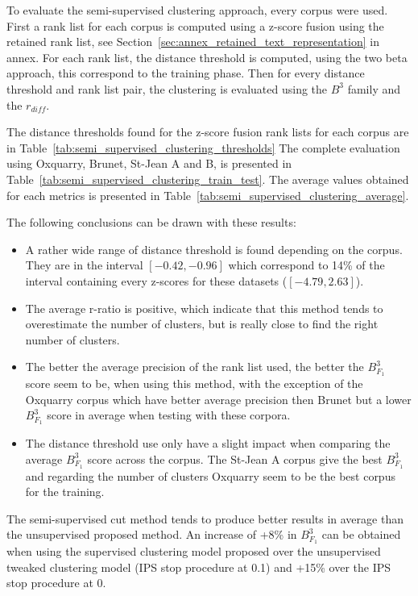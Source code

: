 To evaluate the semi-supervised clustering approach, every corpus were used.
First a rank list for each corpus is computed using a z-score fusion using the retained rank list, see Section~\ref{sec:annex_retained_text_representation} in annex.
For each rank list, the distance threshold is computed, using the two beta approach, this correspond to the training phase.
Then for every distance threshold and rank list pair, the clustering is evaluated using the $B^3$ family and the $r_{diff}$.

The distance thresholds found for the z-score fusion rank lists for each corpus are in Table~\ref{tab:semi_supervised_clustering_thresholds}
The complete evaluation using Oxquarry, Brunet, St-Jean A and B, is presented in Table~\ref{tab:semi_supervised_clustering_train_test}.
The average values obtained for each metrics is presented in Table~\ref{tab:semi_supervised_clustering_average}.

The following conclusions can be drawn with these results:
\begin{itemize}
  \item
  A rather wide range of distance threshold is found depending on the corpus. They are in the interval $\left[-0.42, -0.96\right]$ which correspond to 14\% of the interval containing every z-scores for these datasets ($\left[-4.79, 2.63\right]$).
  \item
  The average r-ratio is positive, which indicate that this method tends to overestimate the number of clusters, but is really close to find the right number of clusters.
  \item
  The better the average precision of the rank list used, the better the $B^3_{F_1}$ score seem to be, when using this method, with the exception of the Oxquarry corpus which have better average precision then Brunet but a lower $B^3_{F_1}$ score in average when testing with these corpora.
  \item
  The distance threshold use only have a slight impact when comparing the average $B^3_{F_1}$ score across the corpus.
  The St-Jean A corpus give the best $B^3_{F_1}$ and regarding the number of clusters Oxquarry seem to be the best corpus for the training.
\end{itemize}

The semi-supervised cut method tends to produce better results in average than the unsupervised proposed method.
An increase of +8\% in $B^3_{F_1}$ can be obtained when using the supervised clustering model proposed over the unsupervised tweaked clustering model (IPS stop procedure at 0.1) and +15\% over the IPS stop procedure at 0.

